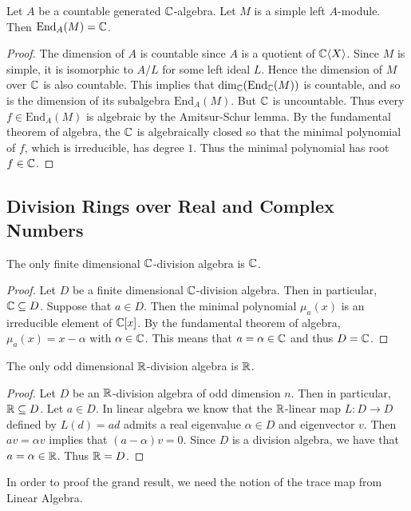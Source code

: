 \documentclass[a4paper]{article}
\begin{document}
\begin{crl}{}{} Let $A$ be a countable generated $\mathbb{C}$-algebra. Let $M$ is a simple left $A$-module. Then $\text{End}_A(M)=\mathbb{C}$. \tcbline
\begin{proof}
The dimension of $A$ is countable since $A$ is a quotient of $\mathbb{C}\langle X\rangle$. Since $M$ is simple, it is isomorphic to $A/L$ for some left ideal $L$. Hence the dimension of $M$ over $\mathbb{C}$ is also countable. This implies that $\dim_{\mathbb{C}}(\text{End}_{\mathbb{C}}(M))$ is countable, and so is the dimension of its subalgebra $\text{End}_A(M)$. But $\mathbb{C}$ is uncountable. Thus every $f\in\text{End}_A(M)$ is algebraic by the Amitsur-Schur lemma. By the fundamental theorem of algebra, the $\mathbb{C}$ is algebraically closed so that the minimal polynomial of $f$, which is irreducible, has degree $1$. Thus the minimal polynomial has root $f\in\mathbb{C}$. 
\end{proof}
\end{crl}

\subsection{Division Rings over Real and Complex Numbers}
\begin{prp}{}{} The only finite dimensional $\mathbb{C}$-division algebra is $\mathbb{C}$. \tcbline
\begin{proof}
Let $D$ be a finite dimensional $\mathbb{C}$-division algebra. Then in particular, $\mathbb{C}\subseteq D$. Suppose that $a\in D$. Then the minimal polynomial $\mu_a(x)$ is an irreducible element of $\mathbb{C}[x]$. By the fundamental theorem of algebra, $\mu_a(x)=x-\alpha$ with $\alpha\in\mathbb{C}$. This means that $a=\alpha\in\mathbb{C}$ and thus $D=\mathbb{C}$. 
\end{proof}
\end{prp}

\begin{prp}{}{} The only odd dimensional $\mathbb{R}$-division algebra is $\mathbb{R}$. \tcbline
\begin{proof}
Let $D$ be an $\mathbb{R}$-division algebra of odd dimension $n$. Then in particular, $\mathbb{R}\subseteq D$. Let $a\in D$. In linear algebra we know that the $\mathbb{R}$-linear map $L:D\to D$ defined by $L(d)=ad$ admits a real eigenvalue $\alpha\in D$ and eigenvector $v$. Then $av=\alpha v$ implies that $(a-\alpha)v=0$. Since $D$ is a division algebra, we have that $a=\alpha\in\mathbb{R}$. Thus $\mathbb{R}=D$. 
\end{proof}
\end{prp}

In order to proof the grand result, we need the notion of the trace map from Linear Algebra. 
\end{document}
